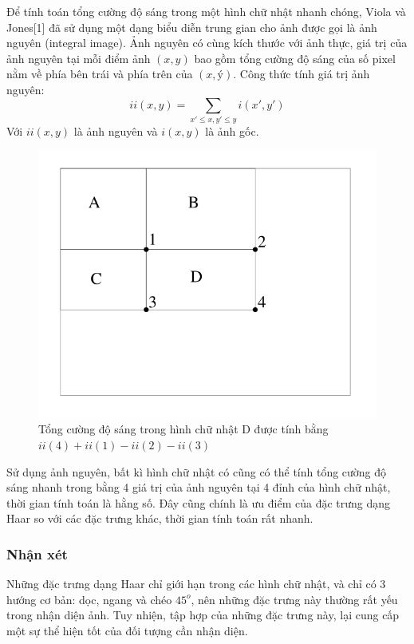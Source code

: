 \documentclass[14pt, oneside, a4paper, openany]{scrartcl}
\begin{document}
Để tính toán tổng cường độ sáng trong một hình chữ nhật nhanh chóng, Viola và Jones[1] đã sử dụng một dạng biểu diễn trung gian cho ảnh được gọi là ảnh nguyên (integral image). Ảnh nguyên có cùng kích thước với ảnh thực, giá trị của ảnh nguyên tại mỗi điểm ảnh $(x,y)$ bao gồm tổng cường độ sáng của số pixel nằm về phía bên trái và phía trên của $(x,ý)$. Công thức tính giá trị ảnh nguyên:
$$
ii(x,y) = \sum_{x' \leq x, y' \leq y} i(x',y')
$$
Với $ii(x,y)$ là ảnh nguyên và $i(x,y)$ là ảnh gốc.
\begin{figure}
	\centering
	\includegraphics[scale=0.5]{figures/integralImage.png} 
	\caption[Tổng cường độ sáng trong hình chữ nhật]{Tổng cường độ sáng trong hình chữ nhật D được tính bằng $ii(4) + ii(1) - ii(2) - ii(3)$}
\end{figure}
Sử dụng ảnh nguyên, bất kì hình chữ nhật có cũng có thể tính tổng cường độ sáng nhanh trong bằng 4 giá trị của ảnh nguyên tại 4 đỉnh của hình chữ nhật, thời gian tính toán là hằng số. Đây cũng chính là ưu điểm của đặc trưng dạng Haar so với các đặc trưng khác, thời gian tính toán rất nhanh.

\subsubsection{Nhận xét}
Những đặc trưng dạng Haar chỉ giới hạn trong các hình chữ nhật, và chỉ có 3 hướng cơ bản: dọc, ngang và chéo $45^o$, nên những đặc trưng này thường rất yếu trong nhận diện ảnh. Tuy nhiện, tập hợp của những đặc trưng này, lại cung cấp một sự thể hiện tốt của đối tượng cần nhận diện.
\end{document}
